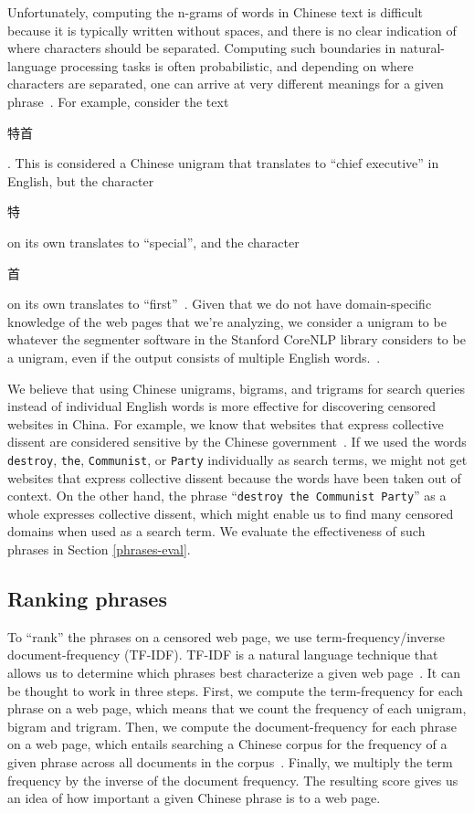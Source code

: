 Unfortunately, computing the n-grams of words in Chinese text is
difficult because it is typically written without spaces, and there is
no clear indication of where characters should be separated. Computing
such boundaries in natural-language processing tasks is often
probabilistic, and depending on where characters are separated, one
can arrive at very different meanings for a given
phrase~\cite{stanford:segmenter}. For example, consider the
text \begin{CJK*}{UTF8}{gbsn}特首\end{CJK*}. This is considered a
Chinese unigram that translates to ``chief executive'' in English, but
the character \begin{CJK*}{UTF8}{gbsn}特
\end{CJK*} on its own translates to ``special'', and the
character \begin{CJK*}{UTF8}{gbsn}首\end{CJK*} on its own translates
to ``first''~\cite{google:translate}. Given that we do not have
domain-specific knowledge of the web pages that we're analyzing, we
consider a unigram to be whatever the segmenter software in the
Stanford CoreNLP library considers to be a unigram, even if the output
consists of multiple English words.~\cite{tseng2005conditional,
chang2008optimizing}.

We believe that using Chinese unigrams, bigrams, and trigrams for search queries
instead of individual English words is more effective for discovering
censored websites in China. For example, we know that websites that
express collective dissent are considered sensitive by the Chinese
government~\cite{king2013censorship}. If we used the words
\texttt{destroy}, \texttt{the}, \texttt{Communist}, or \texttt{Party}
individually as search terms, we might not get websites that express
collective dissent because the words have been taken out of
context. On the other hand, the phrase ``\texttt{destroy the Communist
Party}'' as a whole expresses collective dissent, which might enable us
to find many censored domains when used as a search term. We evaluate
the effectiveness of such phrases in Section \ref{phrases-eval}.

\subsection{Ranking phrases} \label{tf-idf}
To ``rank'' the phrases on a censored web page, we use
term-frequency/inverse document-frequency (TF-IDF). TF-IDF is a
natural language technique that allows us to determine which phrases
best characterize a given web page~\cite{ramos2003using}. It can be
thought to work in three steps. First, we compute the term-frequency
for each phrase on a web page, which means that we count the frequency
of each unigram, bigram and trigram. Then, we compute the document-frequency
for each phrase on a web page, which entails searching a Chinese corpus
for the frequency of a given phrase across all documents in the
corpus~\cite{phrasefinder}. Finally, we multiply the term frequency by
the inverse of the document frequency. The resulting score gives us an
idea of how important a given Chinese phrase is to a web page.

